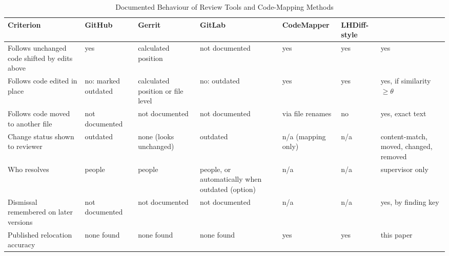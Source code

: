 \begin{table}[t]
\caption{Documented Behaviour of Review Tools and Code-Mapping Methods}\label{tab:related}
\centering\footnotesize
\setlength{\tabcolsep}{3pt}
\begin{tabular}{@{}p{}p{}p{}p{}p{}p{}p{}@{}}\toprule
Criterion & GitHub \cite{github2018outdating} & Gerrit \cite{gerritporting} & GitLab \cite{gitlabautoresolve} & CodeMapper \cite{hu2026codemapper} & LHDiff-style \cite{asaduzzaman2013lhdiff} & \sys{} \\ \midrule
Follows unchanged code shifted by edits above & yes & calculated position & not documented & yes & yes & yes \\
Follows code edited in place & no: marked outdated & calculated position or file level & no: outdated & yes & yes & yes, if similarity $\ge\theta$ \\
Follows code moved to another file & not documented & not documented & not documented & via file renames & no & yes, exact text \\
Change status shown to reviewer & outdated & none (looks unchanged) & outdated & n/a (mapping only) & n/a & content-match, moved, changed, removed \\
Who resolves & people & people & people, or automatically when outdated (option) & n/a & n/a & supervisor only \\
Dismissal remembered on later versions & not documented & not documented & not documented & n/a & n/a & yes, by finding key \\
Published relocation accuracy & none found & none found & none found & yes & yes & this paper \\ \bottomrule
\end{tabular}
\end{table}

